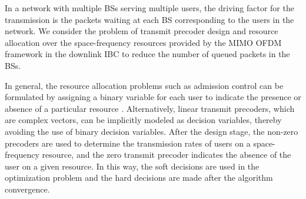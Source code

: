 In a network with multiple \acp{BS} serving multiple users, the driving factor for the transmission is the packets waiting at each \ac{BS} corresponding to the users in the network. We consider the problem of transmit precoder design and resource allocation over the space-frequency resources provided by the \ac{MIMO} \ac{OFDM} framework in the downlink \ac{IBC} to reduce the number of queued packets in the \acp{BS}. %

In general, the resource allocation problems such as admission control can be formulated by assigning a binary variable for each user to indicate the presence or absence of a particular resource \cite{admission_control}. Alternatively, linear transmit precoders, which are complex vectors, can be implicitly modeled as decision variables, thereby avoiding the use of binary decision variables. After the design stage, the non-zero precoders are used to determine the transmission rates of users on a space-frequency resource, and the zero transmit precoder indicates the absence of the user on a given resource. In this way, the soft decisions are used in the optimization problem and the hard decisions are made after the algorithm convergence.

